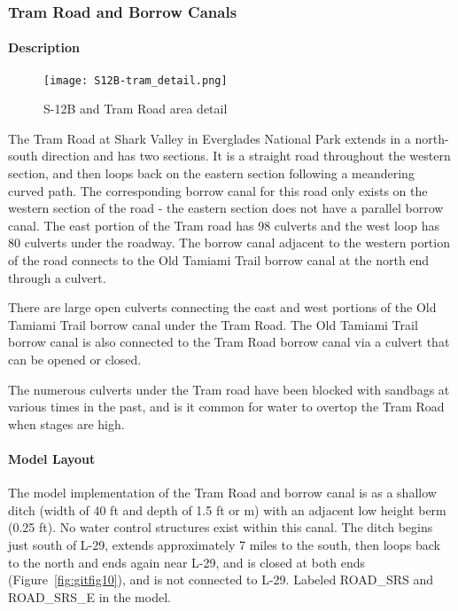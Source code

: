 \clearpage
\subsubsection{Tram Road and Borrow Canals}
\paragraph{Description}

\begin{figure}[!h]
  \begin{center}
  \texttt{[image: S12B-tram\_detail.png]}
  \caption{S-12B and Tram Road area detail}
  \end{center}
\end{figure}

The Tram Road at Shark Valley in Everglades National Park extends in a north-south direction and has two sections. It is a straight road throughout the western section, and then loops back on the eastern section following a meandering curved path. The corresponding borrow canal for this road only exists on the western section of the road - the eastern section does not have a parallel borrow canal. The east portion of the Tram road has 98 culverts and the west loop has 80 culverts under the roadway. The borrow canal adjacent to the western portion of the road connects to the Old Tamiami Trail borrow canal at the north end through a culvert.

There are large open culverts connecting the east and west portions of the Old Tamiami Trail borrow canal under the Tram Road. The Old Tamiami Trail borrow canal is also connected to the Tram Road borrow canal via a culvert that can be opened or closed.

The numerous culverts under the Tram road have been blocked with sandbags at various times in the past, and is it common for water to overtop the Tram Road when stages are high.

\paragraph{Model Layout}

The model implementation of the Tram Road and borrow canal is as a shallow ditch (width of 40 ft and depth of 1.5 ft or m) with an adjacent low height berm (0.25 ft). No water control structures exist within this canal. The ditch begins just south of L-29, extends approximately 7 miles to the south, then loops back to the north and ends again near L-29, and is closed at both ends (Figure~\ref{fig:gitfig10}), and is not connected to L-29. Labeled ROAD\_SRS and ROAD\_SRS\_E in the model.

